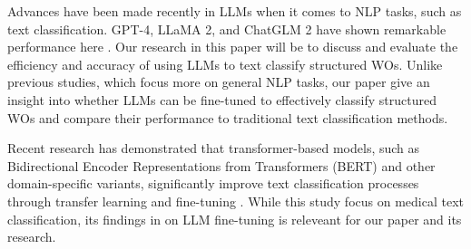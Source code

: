 \documentclass{article}
\begin{document}
Advances have been made recently in LLMs when it comes to NLP tasks, such as text classification.
GPT-4, LLaMA 2, and ChatGLM 2 have shown remarkable performance here \cite{zhang2024}.
Our research in this paper will be to discuss and evaluate the efficiency and accuracy of using LLMs
to text classify structured WOs. Unlike previous studies, which focus more on general NLP tasks,
our paper give an insight into whether LLMs can be fine-tuned to effectively classify structured WOs and
compare their performance to traditional text classification methods.

Recent research has demonstrated that transformer-based models, such as
Bidirectional Encoder Representations from Transformers (BERT) and other domain-specific variants,
significantly improve text classification processes through transfer learning and fine-tuning \cite{Nazyrova2024}.
While this study focus on medical text classification, its findings in on LLM fine-tuning is releveant for our
paper and its research.




\end{document}
